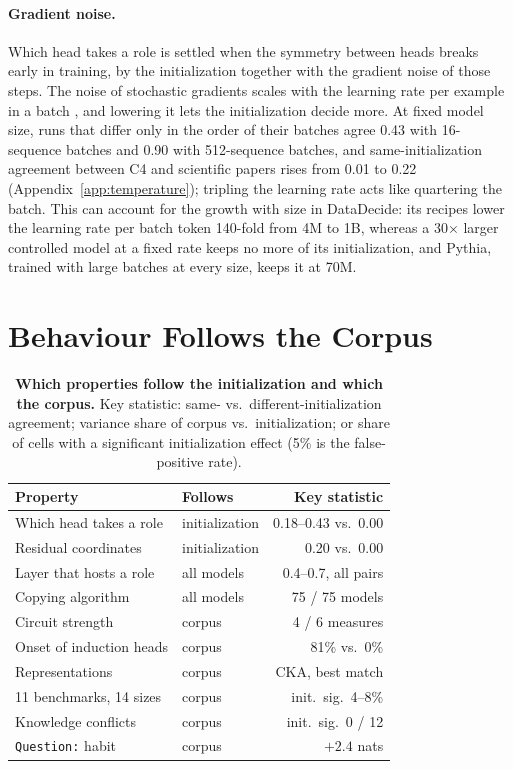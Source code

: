 \documentclass[11pt]{article}
\newcommand{\byinit}[1]{\textcolor{init}{#1}}
\newcommand{\bycorpus}[1]{\textcolor{corpus}{#1}}
\newcommand{\tmpl}[1]{\texttt{#1}}
\begin{document}
\paragraph{Gradient noise.}
Which head takes a role is settled when the symmetry between heads breaks early in training, by the initialization together with the gradient noise of those steps.
The noise of stochastic gradients scales with the learning rate per example in a batch \citep{smith2018bayesian,jastrzebski2018three}, and lowering it lets the initialization decide more.
At fixed model size, runs that differ only in the order of their batches agree 0.43 with 16-sequence batches and 0.90 with 512-sequence batches, and same-initialization agreement between C4 and scientific papers rises from 0.01 to 0.22 (Appendix~\ref{app:temperature}); tripling the learning rate acts like quartering the batch.
This can account for the growth with size in DataDecide: its recipes lower the learning rate per batch token 140-fold from 4M to 1B, whereas a 30$\times$ larger controlled model at a fixed rate keeps no more of its initialization, and Pythia, trained with large batches at every size, keeps it at 70M.

\section{Behaviour Follows the Corpus}
\label{sec:boundary}

\begin{table}[t]
  \centering
  \footnotesize
  \setlength{\tabcolsep}{2.4pt}
  \begin{tabular}{@{}llr@{}}
    \toprule
    Property & Follows & Key statistic \\
    \midrule
    Which head takes a role & \byinit{initialization} & 0.18--0.43 vs.\ 0.00 \\
    Residual coordinates & \byinit{initialization} & 0.20 vs.\ 0.00 \\
    Layer that hosts a role & all models & 0.4--0.7, all pairs \\
    Copying algorithm & all models & 75 / 75 models \\
    Circuit strength & \bycorpus{corpus} & 4 / 6 measures \\
    Onset of induction heads & \bycorpus{corpus} & 81\% vs.\ 0\% \\
    Representations & \bycorpus{corpus} & CKA, best match \\
    11 benchmarks, 14 sizes & \bycorpus{corpus} & init.\ sig.\ 4--8\% \\
    Knowledge conflicts & \bycorpus{corpus} & init.\ sig.\ 0 / 12 \\
    \tmpl{Question:} habit & \bycorpus{corpus} & $+2.4$ nats \\
    \bottomrule
  \end{tabular}
  \caption{\textbf{Which properties follow the initialization and which the corpus.} Key statistic: same- vs.\ different-initialization agreement; variance share of corpus vs.\ initialization; or share of cells with a significant initialization effect (5\% is the false-positive rate).}
  \label{tab:map}
\end{table}
\end{document}

